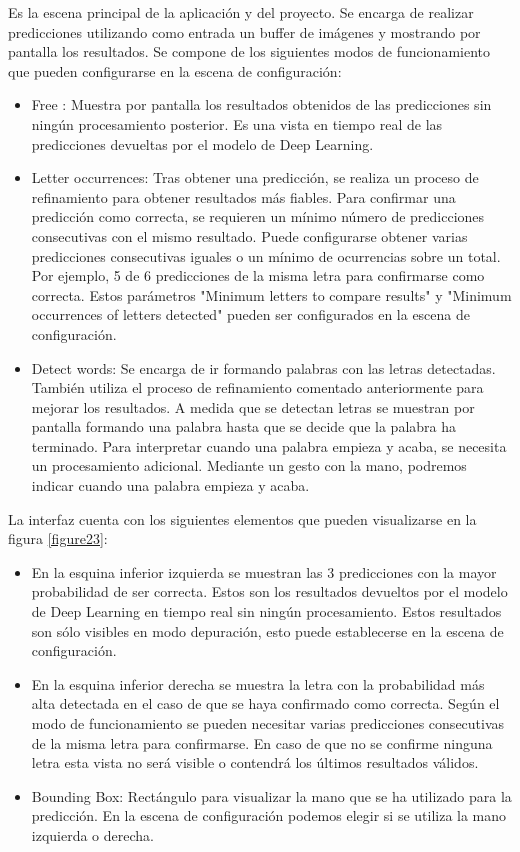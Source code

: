 \documentclass[../main.tex]{subfiles}
\begin{document}
Es la escena principal de la aplicación y del proyecto. Se encarga de realizar predicciones utilizando como entrada un buffer de imágenes y mostrando por pantalla los resultados. Se compone de los siguientes modos de funcionamiento que pueden configurarse en la escena de configuración:

\begin{itemize}
    \item Free \label{free}: Muestra por pantalla los resultados obtenidos de las predicciones sin ningún procesamiento posterior. Es una vista en tiempo real de las predicciones devueltas por el modelo de Deep Learning.
    \item Letter occurrences\label{occurrences}: Tras obtener una predicción, se realiza un proceso de refinamiento para obtener resultados más fiables. Para confirmar una predicción como correcta, se requieren un mínimo número de predicciones consecutivas con el mismo resultado. Puede configurarse obtener varias predicciones consecutivas iguales o un mínimo de ocurrencias sobre un total. Por ejemplo, 5 de 6 predicciones de la misma letra para confirmarse como correcta. Estos parámetros "Minimum letters to compare results" y "Minimum occurrences of letters detected" pueden ser configurados en la escena de configuración.
    \item Detect words\label{words}: Se encarga de ir formando palabras con las letras detectadas. También utiliza el proceso de refinamiento comentado anteriormente para mejorar los resultados. A medida que se detectan letras se muestran por pantalla formando una palabra hasta que se decide que la palabra ha terminado. Para interpretar cuando una palabra empieza y acaba, se necesita un procesamiento adicional. Mediante un gesto con la mano, podremos indicar cuando una palabra empieza y acaba.
\end{itemize}

La interfaz cuenta con los siguientes elementos que pueden visualizarse en la figura \ref{figure23}:

\begin{itemize}
    \item En la esquina inferior izquierda se muestran las 3 predicciones con la mayor probabilidad de ser correcta. Estos son los resultados devueltos por el modelo de Deep Learning en tiempo real sin ningún procesamiento. Estos resultados son sólo visibles en modo depuración,  esto puede establecerse en la escena de configuración.
    \item En la esquina inferior derecha se muestra la letra con la probabilidad más alta detectada en el caso de que se haya confirmado como correcta. Según el modo de funcionamiento se pueden necesitar varias predicciones consecutivas de la misma letra para confirmarse. En caso de que no se confirme ninguna letra esta vista no será visible o contendrá los últimos resultados válidos.
    \item Bounding Box: Rectángulo para visualizar la mano que se ha utilizado para la predicción. En la escena de configuración podemos elegir si se utiliza la mano izquierda o derecha. 
\end{itemize}
\end{document}
